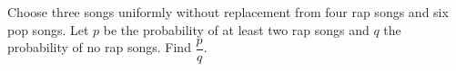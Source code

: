 Choose three songs uniformly without replacement from four rap songs and six pop songs. Let $p$ be the probability of at least two rap songs and $q$ the probability of no rap songs. Find $\dfrac{p}{q}$.
